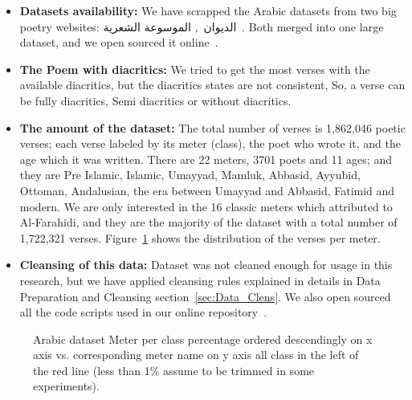 \begin{itemize}

  \item \textbf{Datasets availability:} We have scrapped the Arabic datasets from two big poetry websites: \textarabic{الديوان}~\cite{diwan}, \textarabic{الموسوعة الشعرية}~\cite{PoetryEncyclopedia2016}. Both merged into one large dataset, and we open sourced it online~\cite{ArabicpoetryDS}.

  \item \textbf{The Poem with diacritics:} We tried to get the most verses with the available diacritics, but the diacritics states are not consistent, So, a verse can be fully diacritics, Semi diacritics or without diacritics.

  \item \textbf{The amount of the dataset:} The total number of verses is 1,862,046 poetic verses; each verse labeled by its meter (class), the poet who wrote it, and the age which it was written. There are 22 meters, 3701 poets and 11 ages; and they are Pre Islamic, Islamic, Umayyad, Mamluk, Abbasid, Ayyubid, Ottoman, Andalusian, the era between Umayyad and Abbasid, Fatimid and modern. We are only interested in the 16 classic meters which attributed to Al-Farahidi, and they are the majority of the dataset with a total number of 1,722,321 verses. Figure~\ref{Fig:Data_Size_Distribution} shows the distribution of the verses per meter. %
  
  \item \textbf{Cleansing of this data:} Dataset was not cleaned enough for usage in this research, but we have applied cleansing rules explained in details in Data Preparation and Cleansing section~\ref{sec:Data_Clens}. We also open sourced all the code scripts used in our online repository~\cite{HCILAB_ArabicPoetry_2018}.
\end{itemize}

\begin{figure}[!t]
  \centering
  \begin{tikzpicture}
    
  \end{tikzpicture}%
  \caption{Arabic dataset Meter per class percentage ordered descendingly on x axis vs. corresponding meter name on y axis all class in the left of the red line (less than 1\% assume to be trimmed in some experiments).	}\label{Fig:Data_Size_Distribution}
\end{figure}

